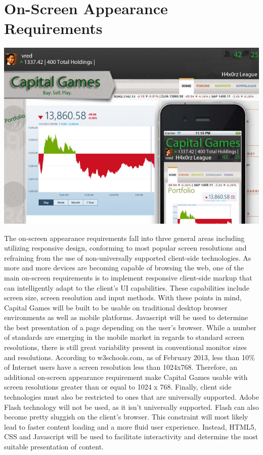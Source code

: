 \section{On-Screen Appearance Requirements}
\centering
\includegraphics[width=5.5in]{./img/responsiveenough.jpg}

The on-screen appearance requirements fall into three general areas including utilizing responsive design, conforming to most popular screen resolutions and refraining from the use of non-universally supported client-side technologies. As more and more devices are becoming capable of browsing the web, one of the main on-screen requirements is to implement responsive client-side markup that can intelligently adapt to the client’s UI capabilities. These capabilities include screen size, screen resolution and input methods. With these points in mind, Capital Games will be built to be usable on traditional desktop browser environments as well as mobile platforms. Javascript will be used to determine the best presentation of a page depending on the user’s browser. While a number of standards are emerging in the mobile market in regards to standard screen resolutions, there is still great variability present in conventional monitor sizes and resolutions. According to w3schools.com, as of February 2013, less than 10\% of Internet users have a screen resolution less than 1024x768. Therefore, an additional on-screen appearance requirement make Capital Games usable with screen resolutions greater than or equal to 1024 x 768. Finally, client side technologies must also be restricted to ones that are universally supported. Adobe Flash technology will not be used, as it isn’t universally supported. Flash can also become pretty sluggish on the client’s browser. This constraint will most likely lead to faster content loading and a more fluid user experience. Instead, HTML5, CSS and Javascript will be used to facilitate interactivity and determine the most suitable presentation of content.